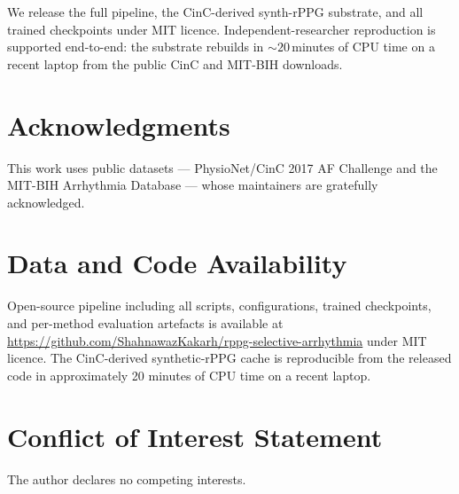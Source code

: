 \documentclass[journal]{IEEEtran}
\begin{document}
We release the full pipeline, the CinC-derived synth-rPPG substrate, and all trained checkpoints under MIT licence. Independent-researcher reproduction is supported end-to-end: the substrate rebuilds in $\sim 20$\,minutes of CPU time on a recent laptop from the public CinC and MIT-BIH downloads.

\section*{Acknowledgments}
This work uses public datasets --- PhysioNet/CinC 2017 AF Challenge and the MIT-BIH Arrhythmia Database --- whose maintainers are gratefully acknowledged.

\section*{Data and Code Availability}
Open-source pipeline including all scripts, configurations, trained checkpoints, and per-method evaluation artefacts is available at \url{https://github.com/ShahnawazKakarh/rppg-selective-arrhythmia} under MIT licence. The CinC-derived synthetic-rPPG cache is reproducible from the released code in approximately 20 minutes of CPU time on a recent laptop.

\section*{Conflict of Interest Statement}
The author declares no competing interests.



\end{document}
